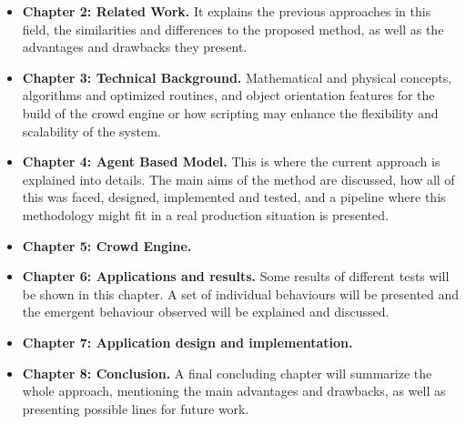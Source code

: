 \begin{itemize}

\item {{\bf Chapter 2: Related Work.} It explains the previous approaches in this field, the similarities and differences to the proposed method, as well as the advantages and drawbacks they present.}

\item {{\bf Chapter 3: Technical Background.} Mathematical and physical concepts, algorithms and optimized routines, and object orientation features for the build of the crowd engine or how scripting may enhance the flexibility and scalability of the system.}

\item {{\bf Chapter 4: Agent Based Model.} This is where the current approach is explained into details. The main aims of the method are discussed, how all of this was faced, designed, implemented and tested, and a pipeline where this methodology might fit in a real production situation is presented.}

\item{{\bf Chapter 5: Crowd Engine.}}

\item {{\bf Chapter 6: Applications and results.} Some results of different tests will be shown in this chapter. A set of individual behaviours will be presented and the emergent behaviour observed will be explained and discussed.}

\item{{\bf Chapter 7: Application design and implementation.}}

\item {{\bf Chapter 8: Conclusion.} A final concluding chapter will summarize the whole approach, mentioning the main advantages and drawbacks, as well as presenting possible lines for future work.}

\end{itemize}

\ifx\isEmbedded\undefined


\pagebreak

\fi

